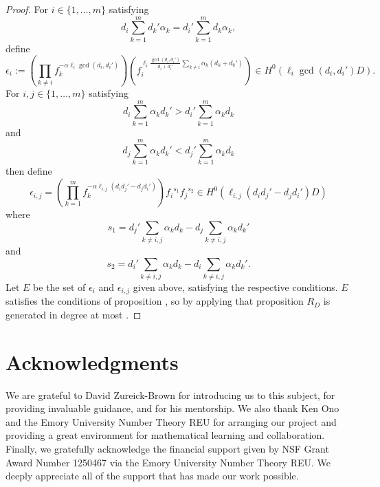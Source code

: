 \documentclass{amsart}
\theoremstyle{plain}
\theoremstyle{definition}
\theoremstyle{remark}
\numberwithin{equation}{section}
\begin{document}
\begin{proof}
For $i \in \{1, \ldots, m\}$ satisfying 
\begin{equation}\label{eqn:condition-for-e_i}
	d_i \sum_{k=1}^m d_k' \alpha_k = d_i' \sum_{k=1}^m d_k \alpha_k,
\end{equation}
define
\[
	\epsilon_i := (\prod_{k \ne i} f_k^{-\alpha \ell_i \gcd(d_i, d_i')}) (f_i^{\ell_i \frac{\gcd(d_i, d_i')}{d_i + d_i'}\sum_{k \ne i} \alpha_k (d_k + d_k')}) \in H^0(\ell_i \gcd(d_i, d_i') D).
\]
For $i, j \in \{1, \ldots, m\}$ satisfying
\begin{equation}\label{eqn:condition-e_i,j-i}
	d_i \sum_{k=1}^m \alpha_k d_k' > d_i' \sum_{k=1}^m \alpha_k d_k
\end{equation}
and
\begin{equation}\label{eqn:condition-e_i,j-j}
	d_j \sum_{k=1}^m \alpha_k d_k' < d_j' \sum_{k=1}^m \alpha_k d_k
\end{equation}
then define
\[
	\epsilon_{i, j} = (\prod_{k = 1}^m f_k^{-\alpha \ell_{i,j} (d_i d_j' - d_j d_i')}) {f_i}^{s_1} {f_j}^{s_2} \in H^0(\ell_{i,j}(d_i d_j' - d_j d_i')D)
\]
where
\[
	s_1 = d_j' \sum_{k \ne i,j} \alpha_k d_k - d_j \sum_{k\ne i, j} \alpha_k d_k'
\]
and
\[
	s_2 = d_i' \sum_{k \ne i,j} \alpha_k d_k - d_i \sum_{k \ne i, j} \alpha_k d_k'.
\]
Let $E$ be the set of $\epsilon_i$ and $\epsilon_{i,j}$ given above, satisfying the respective conditions.
$E$ satisfies the conditions of proposition , so by applying that proposition $R_D$ is generated in degree at most .
\end{proof}



\section{Acknowledgments}

We are grateful to David Zureick-Brown for introducing us to this
subject, for providing invaluable guidance,
and for his mentorship. We also thank Ken Ono and the
Emory University Number Theory REU for arranging our project and
providing a great environment for mathematical learning and
collaboration.
Finally, we gratefully acknowledge the financial support given by
NSF Grant Award Number 1250467 via the Emory University Number
Theory REU. We deeply appreciate all of the support that has made
our work possible.


\nocite{*}
{}

\end{document}

